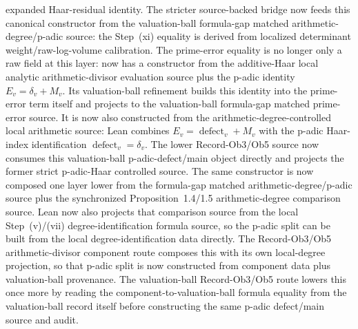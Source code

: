 \begin{proposition}
  expanded Haar-residual identity.  The stricter source-backed bridge
  now feeds this canonical constructor from the valuation-ball formula-gap
  matched arithmetic-degree/p-adic source: the Step~(xi) equality is derived
  from localized determinant weight/raw-log-volume calibration.  The
  prime-error equality is no longer only a raw field at this layer:
  now has a constructor from the additive-Haar local analytic arithmetic-divisor
  evaluation source plus the p-adic identity
  \(E_v=\delta_v+M_v\).  Its valuation-ball refinement
  builds this identity into the prime-error term itself and projects to the
  valuation-ball formula-gap matched prime-error source.  It is now also
  constructed from the arithmetic-degree-controlled local arithmetic source:
  Lean combines \(E_v=\operatorname{defect}_v+M_v\) with the p-adic Haar-index
  identification \(\operatorname{defect}_v=\delta_v\).  The lower
  Record-Ob3/Ob5 source
  now consumes this valuation-ball p-adic-defect/main object directly and
  projects the former strict p-adic-Haar controlled source.  The same
  constructor is
  now composed one layer lower from the formula-gap matched
  arithmetic-degree/p-adic source plus the synchronized Proposition~1.4/1.5
  arithmetic-degree comparison source.  Lean now also projects that comparison
  source from the local Step~(v)/(vii) degree-identification formula source,
  so the p-adic split can be built from the local degree-identification data
  directly.  The Record-Ob3/Ob5 arithmetic-divisor component route composes
  this with its own local-degree projection, so that p-adic split is now
  constructed from component data plus valuation-ball provenance.  The
  valuation-ball Record-Ob3/Ob5 route lowers this once more by reading the
  component-to-valuation-ball formula equality from the valuation-ball record
  itself before constructing the same p-adic defect/main source and audit.

\end{proposition}
